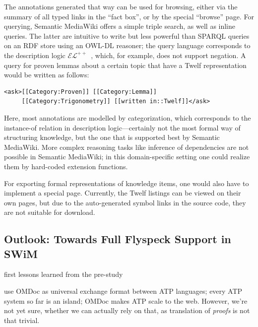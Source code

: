 \documentclass{llncs}
\begin{document}
The annotations generated that way can be used for browsing, either via the summary of all
typed links in the ``fact box'', or by the special ``browse'' page.  For querying,
Semantic MediaWiki offers a simple triple search, as well as inline queries.  The latter
are intuitive to write but less powerful than SPARQL queries on an RDF store using an
OWL-DL reasoner; the query language corresponds to the description logic
$\mathcal{EL}^{++}$~\cite{KrSchVr:semwiki-reasoning07}, which, for example, does not
support negation.  A query for proven lemmas about a certain topic that have a Twelf
representation would be written as follows:

\begin{lstlisting}
<ask>[[Category:Proven]] [[Category:Lemma]]
     [[Category:Trigonometry]] [[written in::Twelf]]</ask>
\end{lstlisting}

Here, most annotations are modelled by categorization, which corresponds to the
instance-of relation in description logic---certainly not the most formal way of
structuring knowledge, but the one that is supported best by Semantic MediaWiki.  More
complex reasoning tasks like inference of dependencies are not possible in Semantic
MediaWiki; in this domain-specific setting one could realize them by hard-coded extension
functions.

For exporting formal representations of knowledge items, one would also have to implement
a special page.  Currently, the Twelf listings can be viewed on their own pages, but due
to the auto-generated symbol links in the source code, they are not suitable for download.

\subsection{Outlook: Towards Full Flyspeck Support in SWiM}
\label{sec:flyspeck-swim}

first lessons learned from the pre-study

use OMDoc as universal exchange format between ATP languages; every ATP system so far is
an island; OMDoc makes ATP scale to the web.  However, we're not yet sure, whether we can actually rely on that, as translation of \emph{proofs} is not
that trivial.

\end{document}
